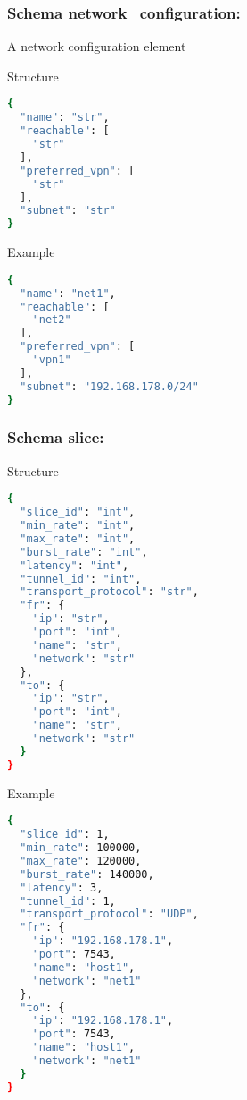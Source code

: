 \subsubsection{Schema network\_configuration:}
\label{dsmf_network_configuration}
A network configuration element
\begin{codes}
\item[Structure] \begin{lstlisting}[language=bash]
{
  "name": "str",
  "reachable": [
    "str"
  ],
  "preferred_vpn": [
    "str"
  ],
  "subnet": "str"
}
\end{lstlisting}
\end{codes}
\begin{codes}
\item[Example] \begin{lstlisting}[language=bash]
{
  "name": "net1",
  "reachable": [
    "net2"
  ],
  "preferred_vpn": [
    "vpn1"
  ],
  "subnet": "192.168.178.0/24"
}
\end{lstlisting}
\end{codes}

\newpage
\subsubsection{Schema slice:}
\label{dsmf_slice}
\begin{codes}
\item[Structure] \begin{lstlisting}[language=bash]
{
  "slice_id": "int",
  "min_rate": "int",
  "max_rate": "int",
  "burst_rate": "int",
  "latency": "int",
  "tunnel_id": "int",
  "transport_protocol": "str",
  "fr": {
    "ip": "str",
    "port": "int",
    "name": "str",
    "network": "str"
  },
  "to": {
    "ip": "str",
    "port": "int",
    "name": "str",
    "network": "str"
  }
}
\end{lstlisting}
\end{codes}
\begin{codes}
\item[Example] \begin{lstlisting}[language=bash]
{
  "slice_id": 1,
  "min_rate": 100000,
  "max_rate": 120000,
  "burst_rate": 140000,
  "latency": 3,
  "tunnel_id": 1,
  "transport_protocol": "UDP",
  "fr": {
    "ip": "192.168.178.1",
    "port": 7543,
    "name": "host1",
    "network": "net1"
  },
  "to": {
    "ip": "192.168.178.1",
    "port": 7543,
    "name": "host1",
    "network": "net1"
  }
}
\end{lstlisting}
\end{codes}

